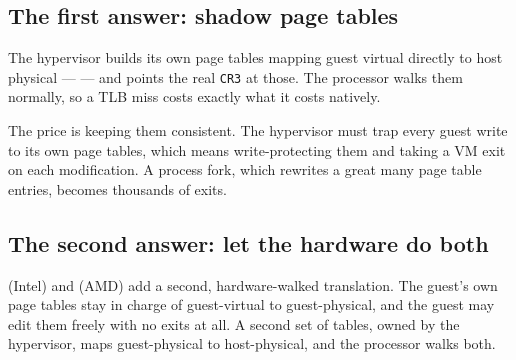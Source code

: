 \subsection{The first answer: shadow page tables}

The hypervisor builds its own page tables mapping guest virtual directly to
host physical ---  --- and points the real \texttt{CR3}
at those. The processor walks them normally, so a TLB miss costs exactly what
it costs natively.

The price is keeping them consistent. The hypervisor must trap every guest
write to its own page tables, which means write-protecting them and taking a VM
exit on each modification. A process fork, which rewrites a great many page
table entries, becomes thousands of exits.

\subsection{The second answer: let the hardware do both}

 (Intel) and  (AMD) add a
second, hardware-walked translation. The guest's own page tables stay in
charge of guest-virtual to guest-physical, and the guest may edit them freely
with no exits at all. A second set of tables, owned by the hypervisor, maps
guest-physical to host-physical, and the processor walks both.

